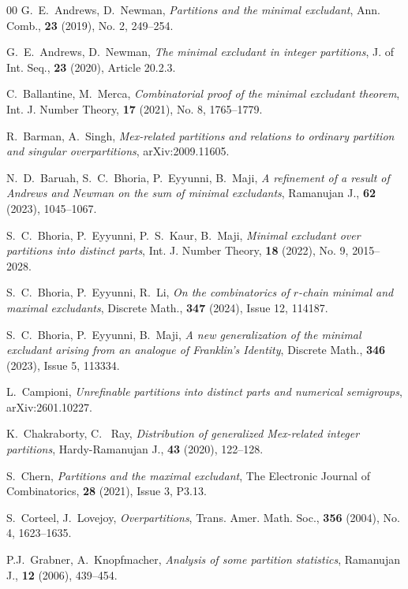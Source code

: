 \documentclass[12pt,reqno]{amsart}
\renewcommand{\(}{\left\(}
\renewcommand{\)}{\right\)}
\renewcommand{\[}{\left\[}
\renewcommand{\]}{\right\]}
\numberwithin{equation}{section}
\theoremstyle{plain}
\begin{document}
\begin{thebibliography}{00}
G.~E.~Andrews, D.~Newman, \emph{Partitions and the minimal excludant}, Ann. Comb.,  \textbf{23} (2019), No. 2, 249--254.

G.~E.~Andrews, D.~Newman, \emph{The minimal excludant in integer partitions}, J. of Int. Seq., \textbf{23} (2020), Article 20.2.3.

C.~Ballantine, M.~Merca, \emph{Combinatorial proof of the minimal excludant theorem},  Int.  J.  Number Theory, \textbf{17} (2021), No. 8, 1765--1779.  

R.~Barman,  A.~Singh, \emph{Mex-related partitions and relations to ordinary partition and singular overpartitions}, arXiv:2009.11605. 

N.~D.~Baruah, S.~C.~Bhoria, P.~Eyyunni, B.~Maji, \emph{A refinement of a result of Andrews and Newman on the sum of minimal excludants}, Ramanujan J., \textbf{62} (2023), 1045--1067.

S.~C.~Bhoria, P.~Eyyunni, P.~S.~Kaur, B.~Maji, \emph{Minimal excludant over partitions into distinct parts}, Int. J. Number Theory, \textbf{18} (2022), No. 9, 2015--2028.

S.~C.~Bhoria, P.~Eyyunni, R.~Li, \emph{On the combinatorics of $r$-chain minimal and maximal excludants}, Discrete Math., \textbf{347} (2024), Issue 12, 114187.

S.~C.~Bhoria, P.~Eyyunni, B.~Maji, \emph{A new generalization of the minimal excludant arising from an analogue of Franklin's Identity}, Discrete Math., \textbf{346} (2023), Issue 5, 113334.

L.~Campioni, \emph{Unrefinable partitions into distinct parts and numerical semigroups}, arXiv:2601.10227.

K.~Chakraborty,  C. ~Ray,  \emph{Distribution of generalized Mex-related integer partitions},  Hardy-Ramanujan J., \textbf{43} (2020), 122--128.

S.~Chern, \emph{Partitions and the maximal excludant}, The Electronic Journal of Combinatorics, \textbf{28} (2021), Issue 3, P3.13.
 
 S.~Corteel, J.~Lovejoy, \emph{Overpartitions}, Trans. Amer. Math. Soc., \textbf{356} (2004), No. 4, 1623--1635.

P.J.~Grabner, A.~Knopfmacher, \emph{Analysis of some partition statistics}, Ramanujan J., \textbf{12} (2006), 439--454.


\end{thebibliography}
\end{document}
